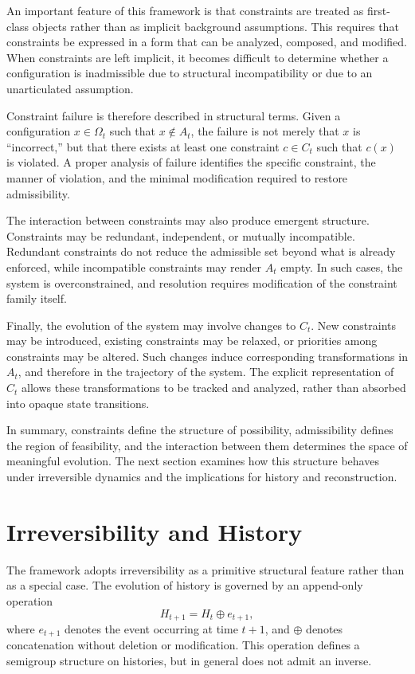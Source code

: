 \documentclass[11pt,oneside]{article}
\begin{document}
An important feature of this framework is that constraints are treated as first-class objects rather than as implicit background assumptions. This requires that constraints be expressed in a form that can be analyzed, composed, and modified. When constraints are left implicit, it becomes difficult to determine whether a configuration is inadmissible due to structural incompatibility or due to an unarticulated assumption.

Constraint failure is therefore described in structural terms. Given a configuration \( x \in \Omega_t \) such that \( x \notin A_t \), the failure is not merely that \( x \) is “incorrect,” but that there exists at least one constraint \( c \in C_t \) such that \( c(x) \) is violated. A proper analysis of failure identifies the specific constraint, the manner of violation, and the minimal modification required to restore admissibility.

The interaction between constraints may also produce emergent structure. Constraints may be redundant, independent, or mutually incompatible. Redundant constraints do not reduce the admissible set beyond what is already enforced, while incompatible constraints may render \( A_t \) empty. In such cases, the system is overconstrained, and resolution requires modification of the constraint family itself.

Finally, the evolution of the system may involve changes to \( C_t \). New constraints may be introduced, existing constraints may be relaxed, or priorities among constraints may be altered. Such changes induce corresponding transformations in \( A_t \), and therefore in the trajectory of the system. The explicit representation of \( C_t \) allows these transformations to be tracked and analyzed, rather than absorbed into opaque state transitions.

In summary, constraints define the structure of possibility, admissibility defines the region of feasibility, and the interaction between them determines the space of meaningful evolution. The next section examines how this structure behaves under irreversible dynamics and the implications for history and reconstruction.

\section{Irreversibility and History}

The framework adopts irreversibility as a primitive structural feature rather than as a special case. The evolution of history is governed by an append-only operation
\[
H_{t+1} = H_t \oplus e_{t+1},
\]
where \( e_{t+1} \) denotes the event occurring at time \( t+1 \), and \( \oplus \) denotes concatenation without deletion or modification. This operation defines a semigroup structure on histories, but in general does not admit an inverse.
\end{document}
